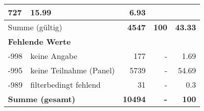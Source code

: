\begin{longtable}{lXrrr}
       \num{727} &
       \num[round-mode=places,round-precision=2]{15,99} &
         \num[round-mode=places,round-precision=2]{6,93} \\
     \midrule
     \multicolumn{2}{l}{Summe (gültig)} &
       \textbf{\num{4547}} &
     \textbf{100} &
       \textbf{\num[round-mode=places,round-precision=2]{43,33}} \\
     \multicolumn{5}{l}{\textbf{Fehlende Werte}}\\
       -998 &
       keine Angabe &
         \num{177} &
        - &
         \num[round-mode=places,round-precision=2]{1,69} \\
       -995 &
       keine Teilnahme (Panel) &
         \num{5739} &
        - &
         \num[round-mode=places,round-precision=2]{54,69} \\
       -989 &
       filterbedingt fehlend &
         \num{31} &
        - &
         \num[round-mode=places,round-precision=2]{0,3} \\
     \midrule
     \multicolumn{2}{l}{\textbf{Summe (gesamt)}} &
          \textbf{\num{10494}} &
        \textbf{-} &
        \textbf{100} \\
     \bottomrule
     \end{longtable}
     
